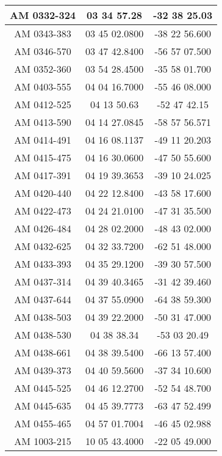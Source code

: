 \begin{apendicesenv}
\begin{longtable}{|c|c|c|}
            AM 0332-324 & 03 34 57.28 & -32 38 25.03 \\ \hline
            AM 0343-383 & 03 45 02.0800 & -38 22 56.600 \\ \hline
            AM 0346-570 & 03 47 42.8400 & -56 57 07.500 \\ \hline
            AM 0352-360 & 03 54 28.4500 & -35 58 01.700 \\ \hline
            AM 0403-555 & 04 04 16.7000 & -55 46 08.000 \\ \hline
            AM 0412-525 & 04 13 50.63 & -52 47 42.15 \\ \hline
            AM 0413-590 & 04 14 27.0845 & -58 57 56.571 \\ \hline
            AM 0414-491 & 04 16 08.1137 & -49 11 20.203 \\ \hline
            AM 0415-475 & 04 16 30.0600 & -47 50 55.600 \\ \hline
            AM 0417-391 & 04 19 39.3653 & -39 10 24.025 \\ \hline
            AM 0420-440 & 04 22 12.8400 & -43 58 17.600 \\ \hline
            AM 0422-473 & 04 24 21.0100 & -47 31 35.500 \\ \hline
            AM 0426-484 & 04 28 02.2000 & -48 43 02.000 \\ \hline
            AM 0432-625 & 04 32 33.7200 & -62 51 48.000 \\ \hline
            AM 0433-393 & 04 35 29.1200 & -39 30 57.500 \\ \hline
            AM 0437-314 & 04 39 40.3465 & -31 42 39.460 \\ \hline
            AM 0437-644 & 04 37 55.0900 & -64 38 59.300 \\ \hline
            AM 0438-503 & 04 39 22.2000 & -50 31 47.000 \\ \hline
            AM 0438-530 & 04 38 38.34 & -53 03 20.49 \\ \hline
            AM 0438-661 & 04 38 39.5400 & -66 13 57.400 \\ \hline
            AM 0439-373 & 04 40 59.5600 & -37 34 10.600 \\ \hline
            AM 0445-525 & 04 46 12.2700 & -52 54 48.700 \\ \hline
            AM 0445-635 & 04 45 39.7773 & -63 47 52.499 \\ \hline
            AM 0455-465 & 04 57 01.7004 & -46 45 02.988 \\ \hline
            AM 1003-215 & 10 05 43.4000 & -22 05 49.000 \\ \hline

\end{longtable}
\end{apendicesenv}
